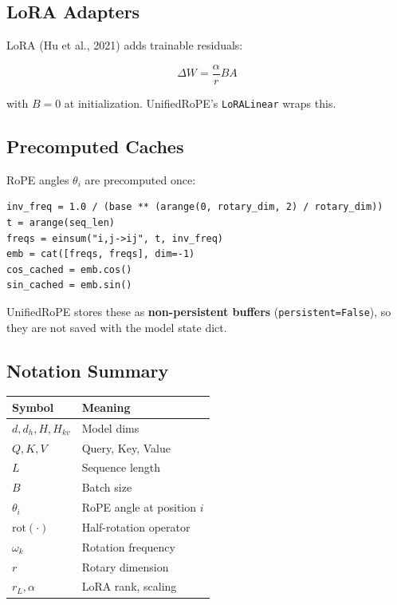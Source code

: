 \subsection{LoRA Adapters}

LoRA (Hu et al., 2021) adds trainable residuals:

\[
\Delta W = \frac{\alpha}{r} B A
\tag{3.8}
\]

with $B = 0$ at initialization. UnifiedRoPE's \texttt{LoRALinear} wraps this.

\subsection{Precomputed Caches}

RoPE angles $\theta_i$ are precomputed once:

\begin{lstlisting}
inv_freq = 1.0 / (base ** (arange(0, rotary_dim, 2) / rotary_dim))
t = arange(seq_len)
freqs = einsum("i,j->ij", t, inv_freq)
emb = cat([freqs, freqs], dim=-1)
cos_cached = emb.cos()
sin_cached = emb.sin()
\end{lstlisting}

UnifiedRoPE stores these as \textbf{non-persistent buffers} (\texttt{persistent=False}), 
so they are not saved with the model state dict.

\subsection{Notation Summary}

\begin{table}[H]
\centering
\small
\begin{tabular}{ll}
\toprule
\textbf{Symbol} & \textbf{Meaning} \\
\midrule
$d, d_h, H, H_{kv}$ & Model dims \\
$Q, K, V$ & Query, Key, Value \\
$L$ & Sequence length \\
$B$ & Batch size \\
$\theta_i$ & RoPE angle at position $i$ \\
$\mathrm{rot}(\cdot)$ & Half-rotation operator \\
$\omega_k$ & Rotation frequency \\
$r$ & Rotary dimension \\
$r_L, \alpha$ & LoRA rank, scaling \\
\bottomrule
\end{tabular}
\end{table}

